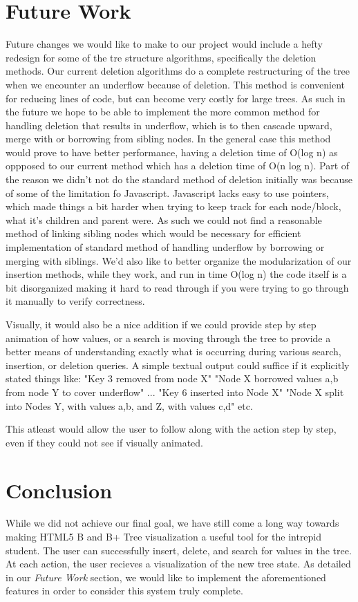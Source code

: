 \section{Future Work}

Future changes we would like to make to our project would include a
hefty redesign for some of the tre structure algorithms, specifically
the deletion methods.  Our current deletion algorithms do a complete
restructuring of the tree when we encounter an underflow because of
deletion.  This method is convenient for reducing lines of code, but
can become very costly for large trees.  As such in the future we hope
to be able to implement the more common method for handling deletion
that results in underflow, which is to then cascade upward, merge with
or borrowing from sibling nodes.  In the general case this method
would prove to have better performance, having a deletion time of
O(log n) as oppposed to our current method which has a deletion time
of O(n log n).  Part of the reason we didn't not do the standard
method of deletion initially was because of some of the limitation fo
Javascript.  Javascript lacks easy to use pointers, which made things
a bit harder when trying to keep track for each node/block, what it's
children and parent were.  As such we could not find a reasonable
method of linking sibling nodes which would be necessary for efficient
implementation of standard method of handling underflow by borrowing
or merging with siblings.  We'd also like to better organize the
modularization of our insertion methods, while they work, and run in
time O(log n) the code itself is a bit disorganized making it hard to
read through if you were trying to go through it manually to verify
correctness.

Visually, it would also be a nice addition if we could provide step by
step animation of how values, or a search is moving through the tree
to provide a better means of understanding exactly what is occurring
during various search, insertion, or deletion queries.  A simple
textual output could suffice if it explicitly stated things like:
"Key 3 removed from node X"
"Node X borrowed values a,b from node Y to cover underflow"
...
"Key 6 inserted into Node X"
"Node X split into Nodes Y, with values a,b, and Z, with values c,d"
etc.

This atleast would allow the user to follow along with the action step
by step, even if they could not see if visually animated.

\section{Conclusion}

While we did not achieve our final goal, we have still come a long way
towards making HTML5 B and B+ Tree visualization a useful tool for the
intrepid student. The user can successfully insert, delete, and search
for values in the tree. At each action, the user recieves a
visualization of the new tree state. As detailed in our \textit{Future
  Work} section, we would like to implement the aforementioned
features in order to consider this system truly complete.

